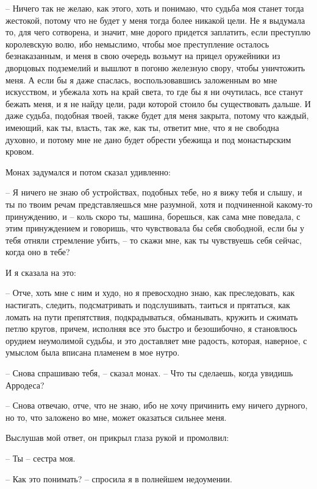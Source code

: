 -- Ничего так не желаю, как этого,  хоть  и  понимаю,  что  судьба  моя
станет  тогда жестокой, потому что не будет у меня тогда более никакой цели.
Не я выдумала  то,  для  чего  сотворена,  и  значит,  мне  дорого  придется
заплатить,  если  преступлю  королевскую  волю,  ибо  немыслимо,  чтобы  мое
преступление осталось безнаказанным, и меня в свою очередь возьмут на прицел
оружейники из дворцовых подземелий и вышлют в погоню железную  свору,  чтобы
уничтожить  меня.  А если бы я даже спаслась, воспользовавшись заложенным во
мне искусством, и убежала хоть на край света, то где бы я ни очутилась,  все
станут  бежать  меня, и я не найду цели, ради которой стоило бы существовать
дальше. И даже судьба, подобная твоей, также будет для меня закрыта,  потому
что  каждый,  имеющий, как ты, власть, так же, как ты, ответит мне, что я не
свободна духовно,  и  потому  мне  не  дано  будет  обрести  убежища  и  под
монастырским кровом.

Монах задумался и потом сказал удивленно:

-- Я  ничего  не  знаю  об устройствах, подобных тебе, но я вижу тебя и
слышу, и ты по твоим речам представляешься мне разумной, хотя и  подчиненной
какому-то  принуждению,  и  -- коль скоро ты, машина, борешься, как сама мне
поведала, с этим принуждением и говоришь, что чувствовала бы себя свободной,
если бы у тебя отняли стремление убить, -- то скажи мне, как  ты  чувствуешь
себя сейчас, когда оно в тебе?

И я сказала на это:

-- Отче,   хоть   мне  с  ним  и  худо,  но  я  превосходно  знаю,  как
преследовать, как настигать, следить, подсматривать и подслушивать,  таиться
и  прятаться,  как  ломать  на пути препятствия, подкрадываться, обманывать,
кружить  и  сжимать  петлю  кругов,  причем,  исполняя  все  это  быстро   и
безошибочно,  я  становлюсь  орудием неумолимой судьбы, и это доставляет мне
радость, которая, наверное, с умыслом была вписана пламенем в мое нутро.

-- Снова спрашиваю тебя, -- сказал монах. --  Что  ты  сделаешь,  когда
увидишь Арродеса?

-- Снова  отвечаю,  отче, что не знаю, ибо не хочу причинить ему ничего
дурного, но то, что заложено во мне, может оказаться сильнее меня.

Выслушав мой ответ, он прикрыл глаза рукой и промолвил:

-- Ты -- сестра моя.

-- Как это понимать? -- спросила я в полнейшем недоумении.

